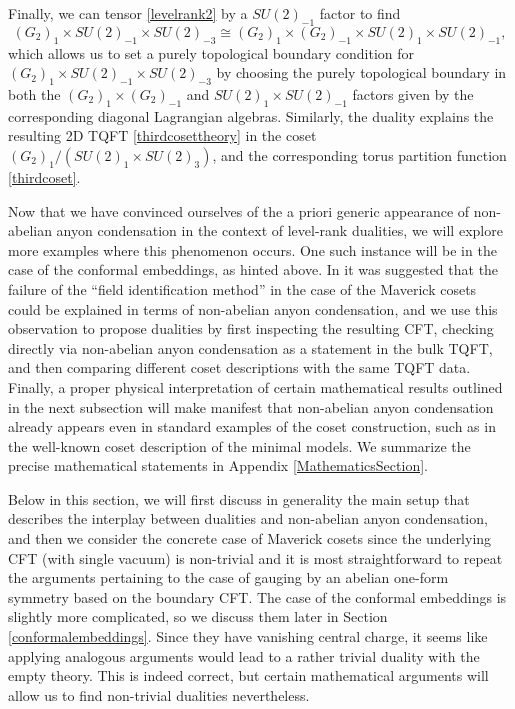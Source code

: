 \documentclass[11pt]{article}
\numberwithin{equation}{section}
\begin{document}
Finally, we can tensor \eqref{levelrank2} by a $SU(2)_{-1}$ factor to find 
\begin{equation} 
    (G_{2})_{1} \times SU(2)_{-1} \times SU(2)_{-3} \cong (G_{2})_{1} \times (G_{2})_{-1} \times SU(2)_{1} \times SU(2)_{-1},
\end{equation}
which allows us to set a purely topological boundary condition for $(G_{2})_{1} \times SU(2)_{-1} \times SU(2)_{-3}$ by choosing the purely topological boundary in both the $(G_{2})_{1} \times (G_{2})_{-1}$ and $SU(2)_{1} \times SU(2)_{-1}$ factors given by the corresponding diagonal Lagrangian algebras. Similarly, the duality explains the resulting 2D TQFT \eqref{thirdcosettheory} in the coset $(G_{2})_{1}/(SU(2)_{1} \times SU(2)_{3})$, and the corresponding torus partition function \eqref{thirdcoset}.

Now that we have convinced ourselves of the a priori generic appearance of non-abelian anyon condensation in the context of level-rank dualities, we will explore more examples where this phenomenon occurs. One such instance will be in the case of the conformal embeddings, as hinted above. In \cite{Bais:2008ni} it was suggested that the failure of the ``field identification method'' in the case of the Maverick cosets could be explained in terms of non-abelian anyon condensation, and we use this observation to propose dualities by first inspecting the resulting CFT, checking directly via non-abelian anyon condensation as a statement in the bulk TQFT, and then comparing different coset descriptions with the same TQFT data. Finally, a proper physical interpretation of certain mathematical results outlined in the next subsection will make manifest that non-abelian anyon condensation already appears even in standard examples of the coset construction, such as in the well-known coset description of the minimal models. We summarize the precise mathematical statements in Appendix \ref{MathematicsSection}.

Below in this section, we will first discuss in generality the main setup that describes the interplay between dualities and non-abelian anyon condensation, and then we consider the concrete case of Maverick cosets since the underlying CFT (with single vacuum) is non-trivial and it is most straightforward to repeat the arguments pertaining to the case of gauging by an abelian one-form symmetry based on the boundary CFT. The case of the conformal embeddings is slightly more complicated, so we discuss them later in Section \ref{conformalembeddings}. Since they have vanishing central charge, it seems like applying analogous arguments would lead to a rather trivial duality with the empty theory. This is indeed correct, but certain mathematical arguments will allow us to find non-trivial dualities nevertheless.
\end{document}
